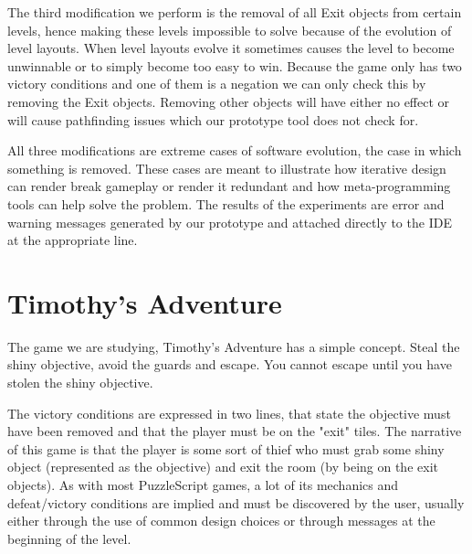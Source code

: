 The third modification we perform is the removal of all Exit objects from certain levels, hence making these levels impossible to solve because of the evolution of level layouts. When level layouts evolve it sometimes causes the level to become unwinnable or to simply become too easy to win. Because the game only has two victory conditions and one of them is a negation we can only check this by removing the Exit objects. Removing other objects will have either no effect or will cause pathfinding issues which our prototype tool does not check for.

All three modifications are extreme cases of software evolution, the case in which something is removed. These cases are meant to illustrate how iterative design can render break gameplay or render it redundant and how meta-programming tools can help solve the problem. The results of the experiments are error and warning messages generated by our prototype and attached directly to the IDE at the appropriate line.

\section{Timothy's Adventure}
The game we are studying, Timothy's Adventure has a simple concept. Steal the shiny objective, avoid the guards and escape. You cannot escape until you have stolen the shiny objective.

The victory conditions are expressed in two lines, that state the objective must have been removed and that the player must be on the "exit" tiles. The narrative of this game is that the player is some sort of thief who must grab some shiny object (represented as the objective) and exit the room (by being on the exit objects). As with most PuzzleScript games, a lot of its mechanics and defeat/victory conditions are implied and must be discovered by the user, usually either through the use of common design choices or through messages at the beginning of the level.

